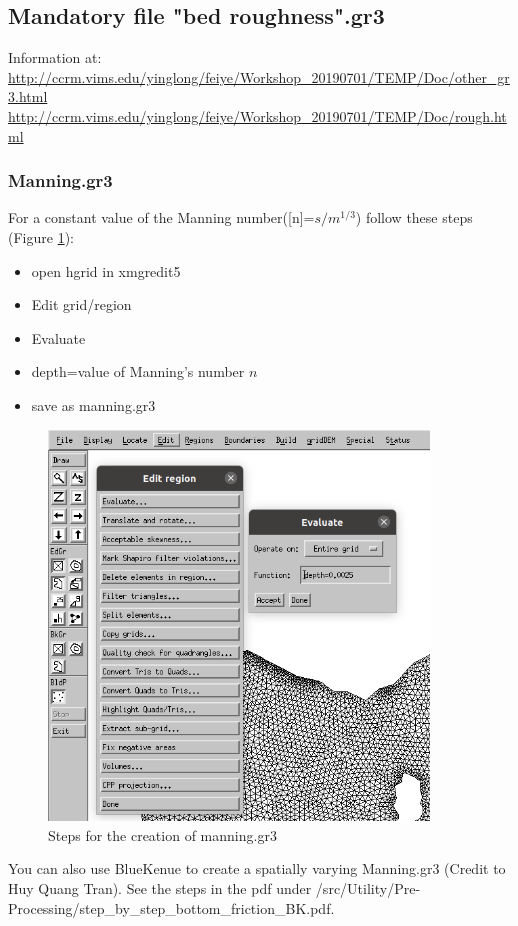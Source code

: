 \documentclass[preprints,briefreport,accept,oneauthor,pdftex]{Definitions/mdpi}
\begin{document}
\subsection{Mandatory file "bed roughness".gr3}
\noindent Information at:\\
\url{http://ccrm.vims.edu/yinglong/feiye/Workshop_20190701/TEMP/Doc/other_gr3.html}
\url{http://ccrm.vims.edu/yinglong/feiye/Workshop_20190701/TEMP/Doc/rough.html}
\subsubsection{Manning.gr3}
\noindent For a constant value of the Manning number([n]=$s/m^{1/3}$) follow these steps (Figure \ref{fig:hgridman}):
\begin{itemize}
    \item open hgrid in xmgredit5
    \item Edit grid/region
    \item Evaluate
    \item depth={value of Manning's number $n$}
    \item save as manning.gr3
\end{itemize}
\begin{figure}
    \centering
    \includegraphics[width=0.9\textwidth]{figures/manning.png}
    \caption{Steps for the creation of manning.gr3}
    \label{fig:hgridman}
\end{figure}
You can also use BlueKenue to create a spatially varying Manning.gr3 (Credit to Huy Quang Tran). See the steps in the pdf under /src/Utility/Pre-Processing/step\_by\_step\_bottom\_friction\_BK.pdf.
\end{document}
